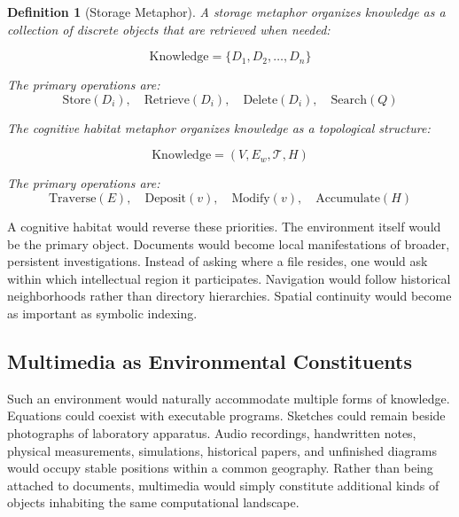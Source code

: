 \documentclass[12pt,oneside]{article}
\newtheorem{definition}{Definition}[section]
\theoremstyle{remark}
\begin{document}
\begin{definition}[Storage Metaphor]
A storage metaphor organizes knowledge as a collection of discrete objects that are retrieved when needed:

\begin{equation}
\text{Knowledge} = \{D_1, D_2, \ldots, D_n\}
\end{equation}

The primary operations are:
\begin{equation}
\text{Store}(D_i), \quad \text{Retrieve}(D_i), \quad \text{Delete}(D_i), \quad \text{Search}(Q)
\end{equation}

The cognitive habitat metaphor organizes knowledge as a topological structure:

\begin{equation}
\text{Knowledge} = (V, E_w, \mathcal{T}, H)
\end{equation}

The primary operations are:
\begin{equation}
\text{Traverse}(E), \quad \text{Deposit}(v), \quad \text{Modify}(v), \quad \text{Accumulate}(H)
\end{equation}
\end{definition}

A cognitive habitat would reverse these priorities. The environment itself would be the primary object. Documents would become local manifestations of broader, persistent investigations. Instead of asking where a file resides, one would ask within which intellectual region it participates. Navigation would follow historical neighborhoods rather than directory hierarchies. Spatial continuity would become as important as symbolic indexing.

\subsection{Multimedia as Environmental Constituents}

Such an environment would naturally accommodate multiple forms of knowledge. Equations could coexist with executable programs. Sketches could remain beside photographs of laboratory apparatus. Audio recordings, handwritten notes, physical measurements, simulations, historical papers, and unfinished diagrams would occupy stable positions within a common geography. Rather than being attached to documents, multimedia would simply constitute additional kinds of objects inhabiting the same computational landscape.
\end{document}

